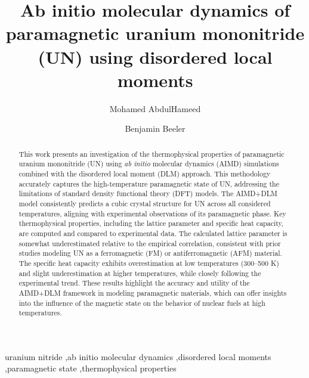 \documentclass[preprint, 12pt]{elsarticle}
\newcommand{\?}{\stackrel{?}{=}}
\begin{document}
\begin{frontmatter}

\title{Ab initio molecular dynamics of paramagnetic uranium mononitride (UN) using disordered local moments}

\author[ncsu]{Mohamed AbdulHameed}
\author[ncsu,inl]{Benjamin Beeler}

\address[ncsu]{Department of Nuclear Engineering, North Carolina State University, Raleigh, NC 27695}
\address[inl]{Idaho National Laboratory, Idaho Falls, ID 83415}

\begin{abstract}

This work presents an investigation of the thermophysical properties of paramagnetic uranium mononitride (UN) using \textit{ab initio} molecular dynamics (AIMD) simulations combined with the disordered local moment (DLM) approach. This methodology accurately captures the high-temperature paramagnetic state of UN, addressing the limitations of standard density functional theory (DFT) models. The AIMD+DLM model consistently predicts a cubic crystal structure for UN across all considered temperatures, aligning with experimental observations of its paramagnetic phase. Key thermophysical properties, including the lattice parameter and specific heat capacity, are computed and compared to experimental data. The calculated lattice parameter is somewhat underestimated relative to the empirical correlation, consistent with prior studies modeling UN as a ferromagnetic (FM) or antiferromagnetic (AFM) material. The specific heat capacity exhibits overestimation at low temperatures (300--500 K) and slight underestimation at higher temperatures, while closely following the experimental trend. These results highlight the accuracy and utility of the AIMD+DLM framework in modeling paramagnetic materials, which can offer insights into the influence of the magnetic state on the behavior of nuclear fuels at high temperatures.

\end{abstract}

\begin{keyword}
uranium nitride \sep ab initio molecular dynamics \sep disordered local moments \sep paramagnetic state \sep thermophysical properties
\end{keyword}

\end{frontmatter}

\linenumbers
\end{document}
